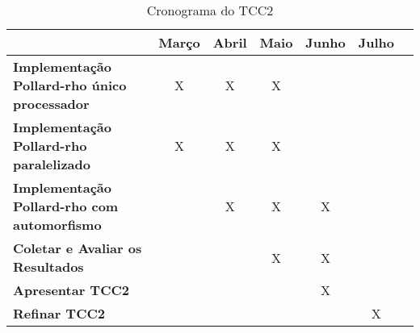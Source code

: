 \begin{table}[h]
\centering
\caption{Cronograma do TCC2}
\label{cronograma tcc2}
\begin{tabular}{|l|c|c|c|c|c|c|}
\hline
                                                     & \multicolumn{1}{l|}{\textbf{Março}} & \multicolumn{1}{l|}{\textbf{Abril}} & \multicolumn{1}{l|}{\textbf{Maio}} & \multicolumn{1}{l|}{\textbf{Junho}} & \multicolumn{1}{l|}{\textbf{Julho}} \\ \hline
\textbf{Implementação Pollard-rho único processador} & X                                   & X                                   & X                                  &                                     &                                     \\ \hline
\textbf{Implementação Pollard-rho paralelizado}      & X                                   & X                                   & X                                  &                                     &                                     \\ \hline
\textbf{Implementação Pollard-rho com automorfismo}  &                                     & X                                   & X                                  & X                                   &                                     \\ \hline
\textbf{Coletar e Avaliar os Resultados}             &                                     &                                     & X                                  & X                                   &                                     \\ \hline
\textbf{Apresentar TCC2}                             &                                     &                                     &                                    & X                                   &                                     \\ \hline
\textbf{Refinar TCC2}                                &                                     &                                     &                                    &                                     & X                                   \\ \hline
\end{tabular}
\end{table}
